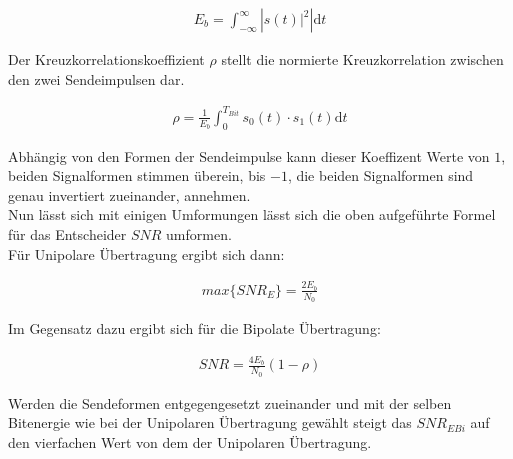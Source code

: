     \begin{equation*}
    	\begin{split}
    		E_b = \int_{-\infty}^{\infty} \left | s(t)|^2 \right | \mathrm dt
    	\end{split}
        
    \end{equation*}
    
    
    Der Kreuzkorrelationskoeffizient $\rho$ stellt die normierte Kreuzkorrelation zwischen den zwei Sendeimpulsen dar.\cite{kreuz}
    
    \begin{equation*}
    	\begin{split}
    		\rho = \frac{1}{E_b} \int_{0}^{T_{Bit}} s_0(t) \cdot s_1(t) \mathrm dt
    	\end{split}
    \end{equation*}
    
    Abhängig von den Formen der Sendeimpulse kann dieser Koeffizent Werte von $1$, beiden Signalformen stimmen überein,
    bis $-1$, die beiden Signalformen sind genau invertiert zueinander, annehmen.\\
        
    Nun lässt sich mit einigen Umformungen lässt sich die oben aufgeführte Formel für das Entscheider $SNR$ umformen.\\
    Für Unipolare Übertragung ergibt sich dann:
    
    \begin{equation*}
    	\begin{split}
    		max\{SNR_E\} = \frac{2 E_b}{N_0}
    	\end{split}
    \end{equation*}
    
    Im Gegensatz dazu ergibt sich für die Bipolate Übertragung:
    
    \begin{equation*}
    	\begin{split}
    		SNR = \frac{4 E_b}{N_0} (1-\rho)
    	\end{split}
    \end{equation*}
    
    Werden die Sendeformen entgegengesetzt zueinander und mit der selben Bitenergie wie bei der Unipolaren
    Übertragung gewählt steigt das $SNR_{E Bi}$ auf den vierfachen Wert von dem der Unipolaren Übertragung.\\
    
    
